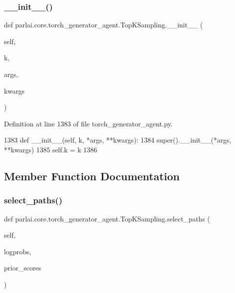 \subsubsection{\texorpdfstring{\+\_\+\+\_\+init\+\_\+\+\_\+()}{\_\_init\_\_()}}
{\footnotesize\ttfamily def parlai.\+core.\+torch\+\_\+generator\+\_\+agent.\+Top\+K\+Sampling.\+\_\+\+\_\+init\+\_\+\+\_\+ (\begin{DoxyParamCaption}\item[{}]{self,  }\item[{}]{k,  }\item[{}]{args,  }\item[{}]{kwargs }\end{DoxyParamCaption})}



Definition at line 1383 of file torch\+\_\+generator\+\_\+agent.\+py.


\begin{DoxyCode}
1383     \textcolor{keyword}{def }\_\_init\_\_(self, k, *args, **kwargs):
1384         super().\_\_init\_\_(*args, **kwargs)
1385         self.k = k
1386 
\end{DoxyCode}


\subsection{Member Function Documentation}
\mbox{\label{classparlai_1_1core_1_1torch__generator__agent_1_1TopKSampling_a3ca83b8ee8aff13c05afbb973f948b6f}} 
\subsubsection{\texorpdfstring{select\+\_\+paths()}{select\_paths()}}
{\footnotesize\ttfamily def parlai.\+core.\+torch\+\_\+generator\+\_\+agent.\+Top\+K\+Sampling.\+select\+\_\+paths (\begin{DoxyParamCaption}\item[{}]{self,  }\item[{}]{logprobs,  }\item[{}]{prior\+\_\+scores }\end{DoxyParamCaption})}



